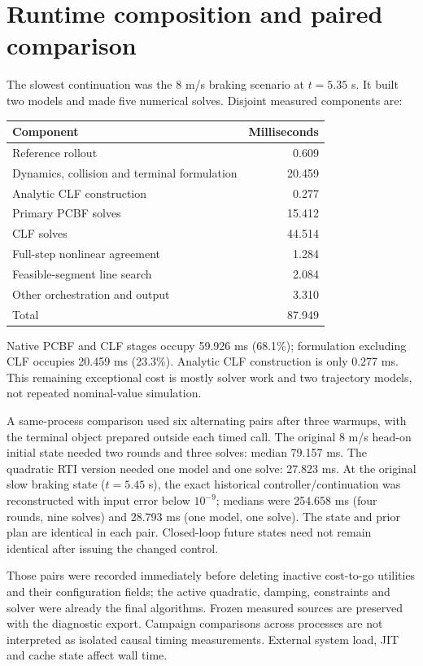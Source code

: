 \documentclass[10pt]{article}
\begin{document}
\section{Runtime composition and paired comparison}
The slowest continuation was the 8 m/s braking scenario at $t=5.35$ s. It built
two models and made five numerical solves. Disjoint measured components are:
\begin{center}\begin{tabular}{lr}\toprule
Component & Milliseconds\\\midrule
Reference rollout & 0.609 \\
Dynamics, collision and terminal formulation & 20.459 \\
Analytic CLF construction & 0.277 \\
Primary PCBF solves & 15.412 \\
CLF solves & 44.514 \\
Full-step nonlinear agreement & 1.284 \\
Feasible-segment line search & 2.084 \\
Other orchestration and output & 3.310 \\
\midrule Total & 87.949\\\bottomrule
\end{tabular}\end{center}
Native PCBF and CLF stages occupy 59.926 ms (68.1\%); formulation excluding CLF
occupies 20.459 ms (23.3\%). Analytic CLF construction is only 0.277 ms.
This remaining exceptional cost is mostly solver work and two trajectory models,
not repeated nominal-value simulation.

A same-process comparison used six alternating pairs after three warmups, with
the terminal object prepared outside each timed call. The original 8 m/s head-on
initial state needed two rounds and three solves: median 79.157 ms. The quadratic
RTI version needed one model and one solve: 27.823 ms. At the original slow braking
state ($t=5.45$ s), the exact historical controller/continuation was reconstructed
with input error below $10^{-9}$; medians were 254.658 ms (four rounds, nine solves)
and 28.793 ms (one model, one solve). The state and prior plan are identical in
each pair. Closed-loop future states need not remain identical after issuing
the changed control.

Those pairs were recorded immediately before deleting inactive cost-to-go
utilities and their configuration fields; the active quadratic, damping,
constraints and solver were already the final algorithms. Frozen measured
sources are preserved with the diagnostic export. Campaign comparisons across
processes are not interpreted as isolated causal timing measurements. External
system load, JIT and cache state affect wall time.
\end{document}
